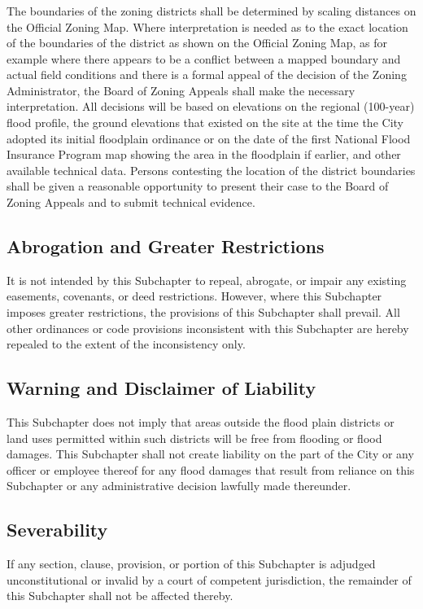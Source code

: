 \subsubsection{}
The boundaries of the zoning districts shall be determined by scaling distances on the Official Zoning Map. Where interpretation is needed as to the exact location of the boundaries of the district as shown on the Official Zoning Map, as for example where there appears to be a conflict between a mapped boundary and actual field conditions and there is a formal appeal of the decision of the Zoning Administrator, the Board of Zoning Appeals shall make the necessary interpretation. All decisions will be based on elevations on the regional (100-year) flood profile, the ground elevations that existed on the site at the time the City adopted its initial floodplain ordinance or on the date of the first National Flood Insurance Program map showing the area in the floodplain if earlier, and other available technical data. Persons contesting the location of the district boundaries shall be given a reasonable opportunity to present their case to the Board of Zoning Appeals and to submit technical evidence.
\subsection{Abrogation and Greater Restrictions}
It is not intended by this Subchapter to repeal, abrogate, or impair any existing easements, covenants, or deed restrictions. However, where this Subchapter imposes greater restrictions, the provisions of this Subchapter shall prevail. All other ordinances or code provisions inconsistent with this Subchapter are hereby repealed to the extent of the inconsistency only.
\subsection{Warning and Disclaimer of Liability}
This Subchapter does not imply that areas outside the flood plain districts or land uses permitted within such districts will be free from flooding or flood damages. This Subchapter shall not create liability on the part of the City or any officer or employee thereof for any flood damages that result from reliance on this Subchapter or any administrative decision lawfully made thereunder.
\subsection{Severability}
If any section, clause, provision, or portion of this Subchapter is adjudged unconstitutional or invalid by a court of competent jurisdiction, the remainder of this Subchapter shall not be affected thereby.
